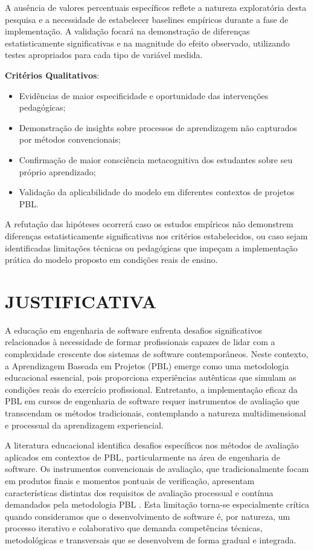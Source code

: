 \documentclass[12pt,a4paper]{article}
\begin{document}
A ausência de valores percentuais específicos reflete a natureza exploratória desta pesquisa e a necessidade de estabelecer baselines empíricos durante a fase de implementação. A validação focará na demonstração de diferenças estatisticamente significativas e na magnitude do efeito observado, utilizando testes apropriados para cada tipo de variável medida.

\textbf{Critérios Qualitativos}:
\begin{itemize}
\item Evidências de maior especificidade e oportunidade das intervenções pedagógicas;
\item Demonstração de insights sobre processos de aprendizagem não capturados por métodos convencionais;
\item Confirmação de maior consciência metacognitiva dos estudantes sobre seu próprio aprendizado;
\item Validação da aplicabilidade do modelo em diferentes contextos de projetos PBL.
\end{itemize}

A refutação das hipóteses ocorrerá caso os estudos empíricos não demonstrem diferenças estatisticamente significativas nos critérios estabelecidos, ou caso sejam identificadas limitações técnicas ou pedagógicas que impeçam a implementação prática do modelo proposto em condições reais de ensino.

\section{JUSTIFICATIVA}

A educação em engenharia de software enfrenta desafios significativos relacionados à necessidade de formar profissionais capazes de lidar com a complexidade crescente dos sistemas de software contemporâneos. Neste contexto, a Aprendizagem Baseada em Projetos (PBL) emerge como uma metodologia educacional essencial, pois proporciona experiências autênticas que simulam as condições reais do exercício profissional. Entretanto, a implementação eficaz da PBL em cursos de engenharia de software requer instrumentos de avaliação que transcendam os métodos tradicionais, contemplando a natureza multidimensional e processual da aprendizagem experiencial.

A literatura educacional identifica desafios específicos nos métodos de avaliação aplicados em contextos de PBL, particularmente na área de engenharia de software. Os instrumentos convencionais de avaliação, que tradicionalmente focam em produtos finais e momentos pontuais de verificação, apresentam características distintas dos requisitos de avaliação processual e contínua demandados pela metodologia PBL \cite{hmelo2004}. Esta limitação torna-se especialmente crítica quando consideramos que o desenvolvimento de software é, por natureza, um processo iterativo e colaborativo que demanda competências técnicas, metodológicas e transversais que se desenvolvem de forma gradual e integrada.
\end{document}
